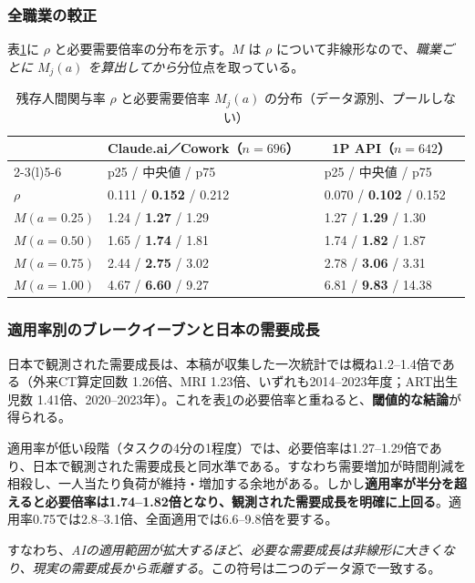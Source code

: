 \documentclass[11pt]{article}
\theoremstyle{plain}
\theoremstyle{definition}
\theoremstyle{remark}
\begin{document}
\subsubsection{全職業の較正}
表\ref{tab:aei-dist}に $\rho$ と必要需要倍率の分布を示す。$M$ は $\rho$ について非線形なので、\emph{職業ごとに $M_j(a)$ を算出してから}分位点を取っている。

\begin{table}[h]\centering\small
\caption{残存人間関与率 $\rho$ と必要需要倍率 $M_j(a)$ の分布（データ源別、プールしない）}\label{tab:aei-dist}
\begin{tabularx}{\textwidth}{@{}lXXXXX@{}}
\toprule
 & \multicolumn{2}{c}{Claude.ai／Cowork（$n=696$）} & & \multicolumn{2}{c}{1P API（$n=642$）} \\
\cmidrule(r){2-3}\cmidrule(l){5-6}
 & p25 / 中央値 / p75 & & & p25 / 中央値 / p75 & \\ \midrule
$\rho$ & 0.111 / \textbf{0.152} / 0.212 & & & 0.070 / \textbf{0.102} / 0.152 & \\
$M(a{=}0.25)$ & 1.24 / \textbf{1.27} / 1.29 & & & 1.27 / \textbf{1.29} / 1.30 & \\
$M(a{=}0.50)$ & 1.65 / \textbf{1.74} / 1.81 & & & 1.74 / \textbf{1.82} / 1.87 & \\
$M(a{=}0.75)$ & 2.44 / \textbf{2.75} / 3.02 & & & 2.78 / \textbf{3.06} / 3.31 & \\
$M(a{=}1.00)$ & 4.67 / \textbf{6.60} / 9.27 & & & 6.81 / \textbf{9.83} / 14.38 & \\
\bottomrule
\end{tabularx}
\end{table}

\subsubsection{適用率別のブレークイーブンと日本の需要成長}
日本で観測された需要成長は、本稿が収集した一次統計では概ね1.2--1.4倍である（外来CT算定回数 1.26倍、MRI 1.23倍、いずれも2014--2023年度；ART出生児数 1.41倍、2020--2023年）。これを表\ref{tab:aei-dist}の必要倍率と重ねると、\textbf{閾値的な結論}が得られる。

\begin{claimbox}
適用率が低い段階（タスクの4分の1程度）では、必要倍率は1.27--1.29倍であり、日本で観測された需要成長と同水準である。すなわち需要増加が時間削減を相殺し、一人当たり負荷が維持・増加する余地がある。しかし\textbf{適用率が半分を超えると必要倍率は1.74--1.82倍となり、観測された需要成長を明確に上回る}。適用率0.75では2.8--3.1倍、全面適用では6.6--9.8倍を要する。

すなわち、\emph{AIの適用範囲が拡大するほど、必要な需要成長は非線形に大きくなり、現実の需要成長から乖離する}。この符号は二つのデータ源で一致する。
\end{claimbox}
\end{document}

